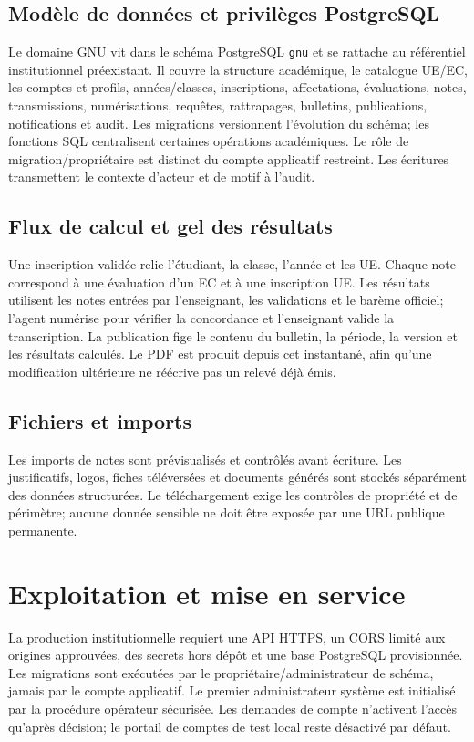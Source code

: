 \documentclass[11pt,a4paper]{article}
\begin{document}
\subsection{Modèle de données et privilèges PostgreSQL}
Le domaine GNU vit dans le schéma PostgreSQL \texttt{gnu} et se rattache au référentiel institutionnel préexistant. Il couvre la structure académique, le catalogue UE/EC, les comptes et profils, années/classes, inscriptions, affectations, évaluations, notes, transmissions, numérisations, requêtes, rattrapages, bulletins, publications, notifications et audit. Les migrations versionnent l’évolution du schéma; les fonctions SQL centralisent certaines opérations académiques. Le rôle de migration/propriétaire est distinct du compte applicatif restreint. Les écritures transmettent le contexte d’acteur et de motif à l’audit.

\subsection{Flux de calcul et gel des résultats}
Une inscription validée relie l’étudiant, la classe, l’année et les UE. Chaque note correspond à une évaluation d’un EC et à une inscription UE. Les résultats utilisent les notes entrées par l’enseignant, les validations et le barème officiel; l’agent numérise pour vérifier la concordance et l’enseignant valide la transcription. La publication fige le contenu du bulletin, la période, la version et les résultats calculés. Le PDF est produit depuis cet instantané, afin qu’une modification ultérieure ne réécrive pas un relevé déjà émis.

\subsection{Fichiers et imports}
Les imports de notes sont prévisualisés et contrôlés avant écriture. Les justificatifs, logos, fiches téléversées et documents générés sont stockés séparément des données structurées. Le téléchargement exige les contrôles de propriété et de périmètre; aucune donnée sensible ne doit être exposée par une URL publique permanente.

\section{Exploitation et mise en service}
La production institutionnelle requiert une API HTTPS, un CORS limité aux origines approuvées, des secrets hors dépôt et une base PostgreSQL provisionnée. Les migrations sont exécutées par le propriétaire/administrateur de schéma, jamais par le compte applicatif. Le premier administrateur système est initialisé par la procédure opérateur sécurisée. Les demandes de compte n’activent l’accès qu’après décision; le portail de comptes de test local reste désactivé par défaut.
\end{document}
